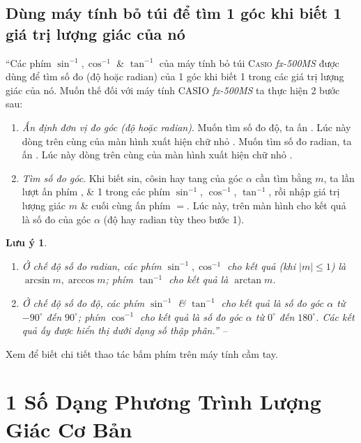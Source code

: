 \documentclass[oneside]{book}
\numberwithin{equation}{section}
\newtheorem{luuy}{Lưu ý}[section]
\begin{document}
\subsection{Dùng máy tính bỏ túi để tìm 1 góc khi biết 1 giá trị lượng giác của nó}
``Các phím $\sin^{-1},\cos^{-1}$ \& $\tan^{-1}$ của máy tính bỏ túi \textsc{Casio} \textit{fx-500MS} được dùng để tìm số đo (độ hoặc radian) của 1 góc khi biết 1 trong các giá trị lượng giác của nó. Muốn thế đối với máy tính CASIO \textit{fx-500MS} ta thực hiện 2 bước sau:
\begin{enumerate}
	\item \textit{Ấn định đơn vị đo góc (độ hoặc radian)}. Muốn tìm số đo độ, ta ấn    . Lúc này dòng trên cùng của màn hình xuất hiện chữ nhỏ . Muốn tìm số đo radian, ta ấn    . Lúc này dòng trên cùng của màn hình xuất hiện chữ nhỏ .
	\item \textit{Tìm số đo góc}. Khi biết sin, côsin hay tang của góc $\alpha$ cần tìm bằng $m$, ta lần lượt ấn phím , \& 1 trong các phím $\boxed{\sin^{-1}}$, $\boxed{\cos^{-1}}$, $\boxed{\tan^{-1}}$, rồi nhập giá trị lượng giác $m$ \& cuối cùng ấn phím $=$. Lúc này, trên màn hình cho kết quả là số đo của góc $\alpha$ (độ hay radian tùy theo bước 1).
\end{enumerate}

\begin{luuy}
	\begin{enumerate}
		\item Ở chế độ số đo radian, các phím $\sin^{-1},\cos^{-1}$ cho kết quả (khi $|m|\le 1$) là $\arcsin m,\arccos m$; phím $\tan^{-1}$ cho kết quả là $\arctan m$.
		\item Ở chế độ số đo độ, các phím $\sin^{-1}$ \& $\tan^{-1}$ cho kết quả là số đo góc $\alpha$ từ $-90^\circ$ đến $90^\circ$; phím $\cos^{-1}$ cho kết quả là số đo góc $\alpha$ từ $0^\circ$ đến $180^\circ$. Các kết quả ấy được hiển thị dưới dạng số thập phân.'' -- \cite[p. 27]{SGK_Toan_11_dai_so_giai_tich_nang_cao}
	\end{enumerate}
\end{luuy}
Xem \cite[Ví dụ 1--3, p. 31]{SGK_Toan_11_dai_so_giai_tich_nang_cao} để biết chi tiết thao tác bấm phím trên máy tính cầm tay.

\section{1 Số Dạng Phương Trình Lượng Giác Cơ Bản}
\end{document}
